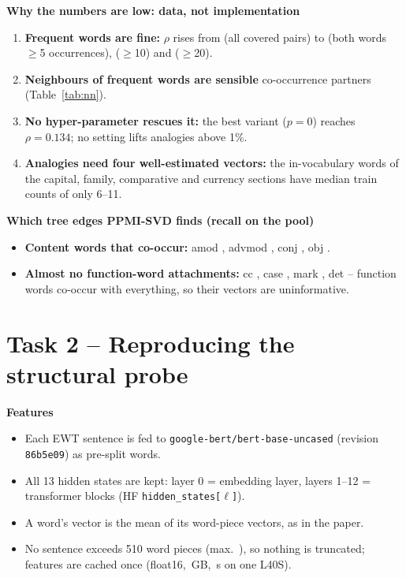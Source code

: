 \documentclass[11pt,a4paper]{article}
\newcommand{\blk}[1]{\par\needspace{5\baselineskip}\smallskip\noindent\textbf{#1}\par\nobreak\vspace{1pt}}
\begin{document}
\blk{Why the numbers are low: data, not implementation}
\begin{enumerate}
\item \textbf{Frequent words are fine:} $\rho$ rises from \TOneWSCov{} (all covered pairs) to \TOneWSFreqFive{} (both words $\ge$5
occurrences), \TOneWSFreqTen{} ($\ge$10) and \TOneWSFreqTwenty{} ($\ge$20).
\item \textbf{Neighbours of frequent words are sensible} co-occurrence partners (Table~\ref{tab:nn}).
\item \textbf{No hyper-parameter rescues it:} the best variant ($p=0$) reaches $\rho=0.134$; no setting lifts analogies above 1\%.
\item \textbf{Analogies need four well-estimated vectors:} the in-vocabulary words of the capital, family, comparative and currency
sections have median train counts of only 6--11.
\end{enumerate}

\blk{Which tree edges PPMI-SVD finds (recall on the pool)}
\begin{itemize}
\item \textbf{Content words that co-occur:} amod \TOneRelAmod, advmod \TOneRelAdvmod, conj \TOneRelConj, obj \TOneRelObj.
\item \textbf{Almost no function-word attachments:} cc \TOneRelCc, case \TOneRelCase, mark \TOneRelMark, det \TOneRelDet{} --
function words co-occur with everything, so their vectors are uninformative.
\end{itemize}

\section{Task 2 -- Reproducing the structural probe}\label{sec:t2}
\blk{Features}
\begin{itemize}
\item Each EWT sentence is fed to \texttt{google-bert/bert-base-uncased} (revision \texttt{86b5e09}) as pre-split words.
\item All 13 hidden states are kept: layer 0 = embedding layer, layers 1--12 = transformer blocks (HF \texttt{hidden\_states[$\ell$]}).
\item A word's vector is the mean of its word-piece vectors, as in the paper.
\item No sentence exceeds 510 word pieces (max.\ \MaxWP), so nothing is truncated; features are cached once
(float16, \FeatGB\,GB, \FeatSeconds\,s on one L40S).
\end{itemize}
\end{document}
